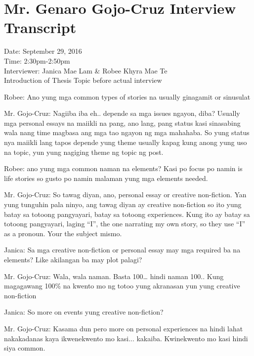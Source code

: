 %
%
%                 

\chapter{Mr. Genaro Gojo-Cruz Interview Transcript}
\label{sec:appendixb}

Date: September 29, 2016 \\
Time: 2:30pm-2:50pm \\
Interviewer: Janica Mae Lam \& Robee Khyra Mae Te \\

Introduction of Thesis Topic before actual interview

Robee: Ano yung mga common types of stories na usually ginagamit or sinusulat

Mr. Gojo-Cruz: Nagiiba iba eh.. depende sa mga issues ngayon, diba? Usually mga personal essays na maiikli na pang, ano lang, pang status kasi sinasabing wala nang time magbasa ang mga tao ngayon ng mga mahahaba. So yung status nya maiikli lang tapos depende yung theme usually kapag kung anong yung uso na topic, yun yung nagiging theme ng topic ng post.

Robee: ano yung mga common naman na elements? Kasi po focus po namin is life stories so gusto po namin malaman yung mga elements needed.

Mr. Gojo-Cruz: So tawag diyan, ano, personal essay or creative non-fiction. Yan yung tunguhin pala ninyo, ang tawag diyan ay creative non-fiction so ito yung batay sa totoong pangyayari, batay sa totoong experiences. Kung ito ay batay sa totoong pangyayari, laging ``I'', the one narrating my own story, so they use ``I'' as a pronoun. Your the subject mismo.

Janica: Sa mga creative non-fiction or personal essay may mga required ba na elements? Like akilangan ba may plot palagi?

Mr. Gojo-Cruz: Wala, wala naman. Basta 100… hindi naman 100.. Kung magagawang 100\% na kwento mo ng totoo yung akranasan yun yung creative non-fiction

Janica: So more on events yung creative non-fiction?

Mr. Gojo-Cruz: Kasama dun pero more on personal experiences na hindi lahat nakakadanas kaya  ikwenekwento mo kasi... kakaiba. Kwinekwento mo kasi hindi siya common. 

